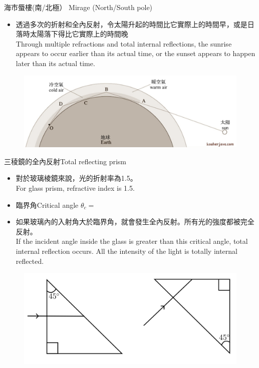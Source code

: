 \documentclass[beamer=true]{standalone}
\begin{document}
\begin{frame}{海市蜃樓(南/北極） Mirage (North/South pole)}
\begin{itemize}
    \item 透過多次的折射和全內反射，令太陽升起的時間比它實際上的時間早，或是日落時太陽落下得比它實際上的時間晚\\Through multiple refractions and total internal reflections, the sunrise appears to occur earlier than its actual time, or the sunset appears to happen later than its actual time.
\end{itemize}
    \begin{figure}
        \centering
        \includegraphics[width=1\linewidth]{assets/deijoii23jnd2398fy98.png}
    \end{figure}
\end{frame}

\begin{frame}{三稜鏡的全內反射Total reflecting prism}
    \begin{itemize}
        \item 對於玻璃棱鏡來說，光的折射率為1.5。\\For glass prism, refractive index is 1.5.
        \item 臨界角Critical angle $\theta_c=$
        \item 如果玻璃內的入射角大於臨界角，就會發生全內反射。所有光的強度都被完全反射。\\If the incident angle inside the glass is greater than this critical angle, total internal reflection occurs. All the intensity of the light is totally internal reflected.
    \end{itemize}
    \begin{figure}
        \centering
        \includegraphics[width=0.55\linewidth]{assets/dmdnuu.png}
    \end{figure}
\end{frame}
\end{document}
